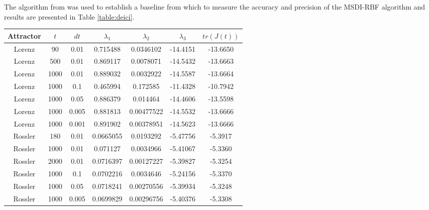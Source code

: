             The algorithm from \cite{item:7} was used to establish a baseline from which to measure the accuracy and precision
            of the MSDI-RBF algorithm and results are presented in Table \ref{table:deici}.
            \begin{table}
                \centering
                \begin{tabular}[h]{||c c c c c c c||}
                    \hline
                    Attractor & $t$ & $dt$ & $\lambda_1$ & $\lambda_2$ & $\lambda_3$ & $tr(J(t))$\\ [0.5ex]
                    \hline
                    Lorenz & 90 & 0.01 & 0.715488 &  0.0346102  &  -14.4151 & -13.6650\\
                    \hline
                    Lorenz & 500 & 0.01 & 0.869117 & 0.0078071 & -14.5432 & -13.6663\\
                    \hline
                    Lorenz & 1000 & 0.01 & 0.889032 & 0.0032922 & -14.5587 & -13.6664\\
                    \hline
                    Lorenz & 1000 & 0.1 & 0.465994 & 0.172585 & -11.4328 & -10.7942\\
                    \hline
                    Lorenz & 1000 & 0.05 & 0.886379 & 0.014464 & -14.4606 & -13.5598\\
                    \hline
                    Lorenz & 1000 & 0.005 & 0.881813 & 0.00477522 & -14.5532 & -13.6666\\
                    \hline
                    Lorenz & 1000 & 0.001 & 0.891902 & 0.00378951 & -14.5623 & -13.6666\\
                    \hline
                    Rossler & 180 & 0.01 & 0.0665055 & 0.0193292 & -5.47756 & -5.3917\\
                    \hline
                    Rossler & 1000 & 0.01 & 0.071127 & 0.0034966 & -5.41067 & -5.3360\\
                    \hline
                    Rossler & 2000 & 0.01 & 0.0716397 & 0.00127227 & -5.39827 & -5.3254\\
                    \hline
                    Rossler & 1000 & 0.1 & 0.0702216 & 0.0034646 & -5.24156 & -5.3370\\
                    \hline
                    Rossler & 1000 & 0.05 & 0.0718241 & 0.00270556 & -5.39934 & -5.3248\\
                    \hline
                    Rossler & 1000 & 0.005 & 0.0699829 & 0.00296756 & -5.40376 & -5.3308\\

\end{tabular}
\end{table}
